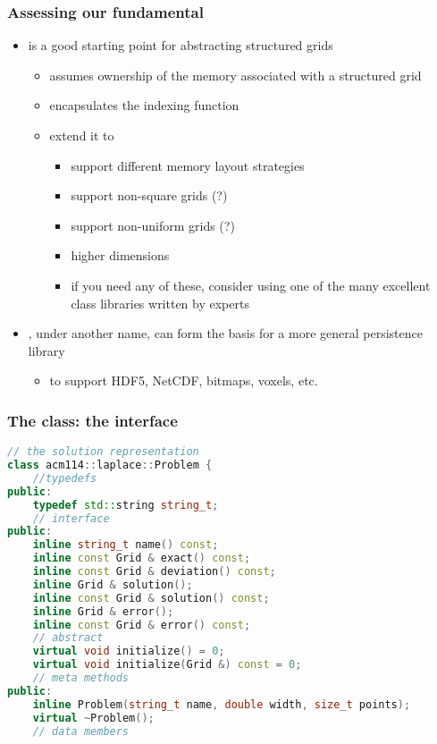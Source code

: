 \begin{frame}[fragile]
%
  \frametitle{Assessing our fundamental}
%
  \begin{itemize}
%
  \item {} is a good starting point for abstracting structured grids
    \begin{itemize}
    \item assumes ownership of the memory associated with a structured grid
    \item encapsulates the indexing function
    \item extend it to
      \begin{itemize}
      \item support different memory layout strategies
      \item support non-square grids (?)
      \item support non-uniform grids (?)
      \item higher dimensions
      \item if you need any of these, consider using one of the many excellent class libraries
        written by experts
      \end{itemize}
    \end{itemize}
%
  \item {}, under another name, can form the basis for a more general
    persistence library
    \begin{itemize}
    \item to support HDF5, NetCDF, bitmaps, voxels, etc.
    \end{itemize}
%
  \end{itemize}
%
\end{frame}

\begin{frame}[fragile]
% 
  \frametitle{The  class: the interface}
%
  \begin{lstlisting}[language=c++,name=Problem]
// the solution representation
class acm114::laplace::Problem {
    //typedefs
public:
    typedef std::string string_t;
    // interface
public:
    inline string_t name() const;
    inline const Grid & exact() const;
    inline const Grid & deviation() const;
    inline Grid & solution();
    inline const Grid & solution() const;
    inline Grid & error();
    inline const Grid & error() const;
    // abstract
    virtual void initialize() = 0;
    virtual void initialize(Grid &) const = 0;
    // meta methods
public:
    inline Problem(string_t name, double width, size_t points);
    virtual ~Problem();
    // data members
  \end{lstlisting}
%
\end{frame}

